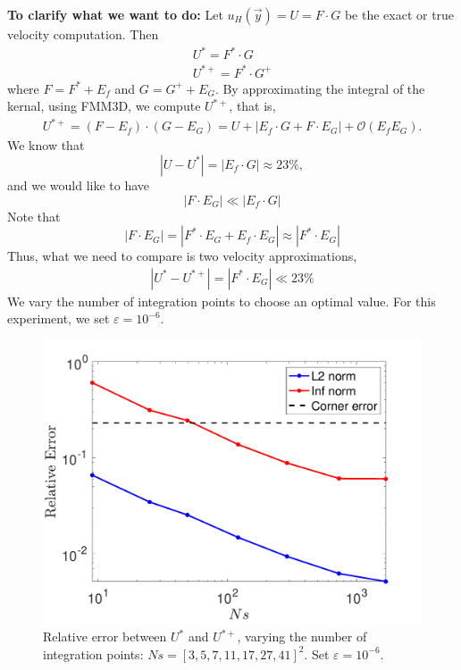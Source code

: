 \par
{\bf To clarify what we want to do:}
Let $u_H(\vec{y})  = U = F \cdot  G$ be the exact or true velocity computation. Then 
\begin{align}
	U^* = F^* \cdot  G
	\\
	U^{*+} = F^* \cdot  G^+
\end{align}
where $F = F^* + E_f$ and $G =  G^+ + E_G$.
By approximating the integral of the kernal, using FMM3D, we compute $U^{*+}$, that is,
\begin{align}
	U^{*+} = (F-E_f) \cdot (G - E_G) 
	= U +  \left| E_f \cdot G + F  \cdot E_G \right|  + \mathcal{O}(E_f E_G).
\end{align}
We know that 
\[
	|U-U^*| = |E_f \cdot G| \approx 23 \%,
	\]
and we would like to have
\[
	|F  \cdot E_G| \ll	|E_f \cdot G |
\]
Note that 
\[
	  |F \cdot E_G| = |F^* \cdot E_G + E_f \cdot E_G|
	  \approx |F^* \cdot E_G |
\]
Thus, what we need to compare is two velocity approximations,
\begin{align}
	|U^* - U^{*+}| =| F^* \cdot E_G| \ll 23 \%
	\label{eq_condition_EG}
\end{align}
We vary the number of integration points to choose an optimal value. For this experiment, we set $\varepsilon = 10^{-6}$.
\begin{figure}[ht]
	\begin{center}
		\includegraphics[scale=0.33]{./figures/fig_Ef_EG_compare}
	\caption{Relative error between $U^*$ and $U^{*+}$, varying the number of integration points: $Ns = [3, 5, 7, 11, 17, 27,41]^2$. Set $\varepsilon = 10^{-6}$.}
	\label{fig_Ef_EG_compare}
\end{center}
\end{figure}
